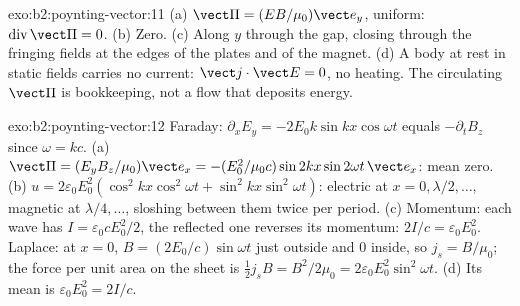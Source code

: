 \begin{solution}{exo:b2:poynting-vector:11}
(a) $\vect\Pi = (EB/\mu_0)\vect e_y$, uniform: $\operatorname{div}\vect\Pi = 0$. (b) Zero.
(c) Along $y$ through the gap, closing through the fringing fields at
the edges of the plates and of the magnet. (d) A body at rest in static
fields carries no current: $\vect j\cdot\vect E = 0$, no heating. The
circulating $\vect\Pi$ is bookkeeping, not a flow that deposits energy.
\end{solution}

\begin{solution}{exo:b2:poynting-vector:12}
Faraday: $\partial_xE_y = -2E_0k\sin kx\cos\omega t$ equals $-\partial_tB_z$ since
$\omega = kc$. (a)
$\vect\Pi = (E_yB_z/\mu_0)\vect e_x = -(E_0^2/\mu_0c)\sin2kx\sin2\omega t\,\vect e_x$: mean
zero. (b) $u = 2\varepsilon_0E_0^2(\cos^2kx\cos^2\omega t + \sin^2kx\sin^2\omega t)$: electric
at $x = 0, \lambda/2, \dots$, magnetic at $\lambda/4, \dots$, sloshing between them
twice per period. (c) Momentum: each wave has $I = \varepsilon_0cE_0^2/2$, the
reflected one reverses its momentum: $2I/c = \varepsilon_0E_0^2$. Laplace: at $x =
0$, $B = (2E_0/c)\sin\omega t$ just outside and $0$ inside, so $j_s = B/\mu_0$; the
force per unit area on the sheet is $\tfrac12j_sB = B^2/2\mu_0 = 2\varepsilon_0E_0^2\sin^2
\omega t$. (d) Its mean is $\varepsilon_0E_0^2 = 2I/c$.
\end{solution}

